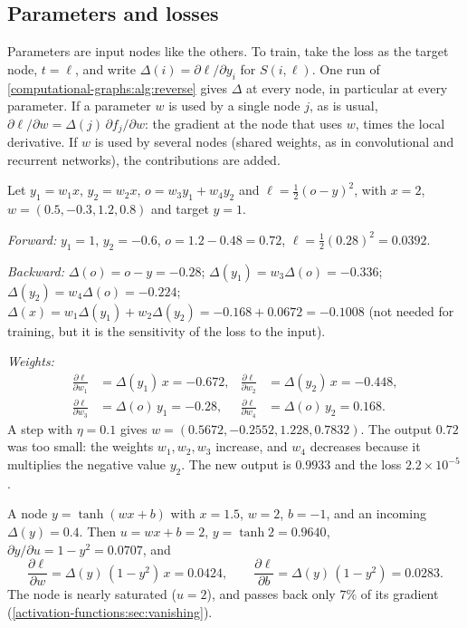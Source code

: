 \begin{notechapter}
\section{Parameters and losses}\label{computational-graphs:sec:params}

Parameters are input nodes like the others. To train, take the loss as the target node,
$t = \ell$, and write $\Delta(i) = \partial\ell/\partial y_i$ for $S(i,\ell)$. One run of
\cref{computational-graphs:alg:reverse} gives $\Delta$ at every node, in particular at every
parameter. If a parameter $w$ is used by a single node $j$, as is usual, $\partial\ell/\partial w = \Delta(j)\,\partial f_j/\partial w$: the
gradient at the node that uses $w$, times the local derivative. If $w$ is used by several nodes
(shared weights, as in convolutional and recurrent networks), the contributions are added.

\begin{example}\label{computational-graphs:ex:weights}
Let $y_1 = w_1x$, $y_2 = w_2x$, $o = w_3y_1 + w_4y_2$ and $\ell = \frac12(o - y)^2$, with $x = 2$, $w = (0.5, -0.3, 1.2, 0.8)$ and target $y = 1$.

\emph{Forward:} $y_1 = 1$, $y_2 = -0.6$, $o = 1.2 - 0.48 = 0.72$, $\ell = \frac12(0.28)^2 = 0.0392$.

\emph{Backward:} $\Delta(o) = o - y = -0.28$; $\Delta(y_1) = w_3\Delta(o) = -0.336$; $\Delta(y_2) = w_4\Delta(o) = -0.224$;
$\Delta(x) = w_1\Delta(y_1) + w_2\Delta(y_2) = -0.168 + 0.0672 = -0.1008$ (not needed for training, but it is the
sensitivity of the loss to the input).

\emph{Weights:}
\begin{align*}
  \frac{\partial\ell}{\partial w_1} &= \Delta(y_1)\,x = -0.672, & \frac{\partial\ell}{\partial w_2} &= \Delta(y_2)\,x = -0.448,\\
  \frac{\partial\ell}{\partial w_3} &= \Delta(o)\,y_1 = -0.28, & \frac{\partial\ell}{\partial w_4} &= \Delta(o)\,y_2 = 0.168 .
\end{align*}
A step with $\eta = 0.1$ gives $w = (0.5672, -0.2552, 1.228, 0.7832)$. The output $0.72$ was too small: the weights
$w_1, w_2, w_3$ increase, and $w_4$ decreases because it multiplies the negative value $y_2$. The new output is
$0.9933$ and the loss $2.2\times10^{-5}$.
\end{example}

\begin{example}\label{computational-graphs:ex:tanh}
A node $y = \tanh(wx + b)$ with $x = 1.5$, $w = 2$, $b = -1$, and an incoming $\Delta(y) = 0.4$. Then $u = wx + b = 2$,
$y = \tanh2 = 0.9640$, $\partial y/\partial u = 1 - y^2 = 0.0707$, and
\[
  \frac{\partial\ell}{\partial w} = \Delta(y)\,(1 - y^2)\,x = 0.0424,\qquad\frac{\partial\ell}{\partial b} = \Delta(y)\,(1 - y^2) = 0.0283 .
\]
The node is nearly saturated ($u = 2$), and passes back only $7\%$ of its gradient
(\cref{activation-functions:sec:vanishing}).
\end{example}


\end{notechapter}
